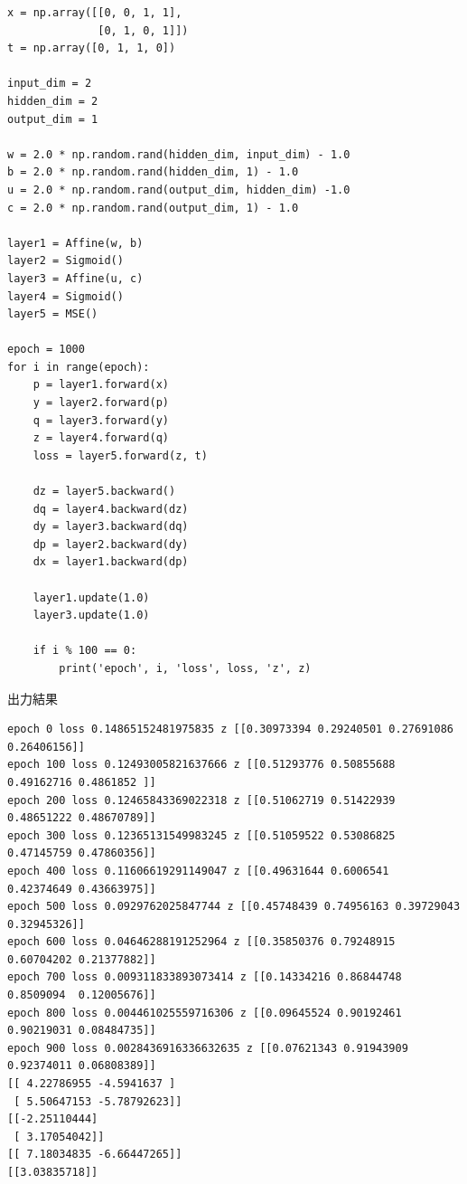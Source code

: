\documentclass[11pt, a4paper]{jsarticle}
\begin{document}
  \begin{lstlisting}[caption=Exercise~3.5, label=src:exercise3.5]
x = np.array([[0, 0, 1, 1],
              [0, 1, 0, 1]])
t = np.array([0, 1, 1, 0])

input_dim = 2
hidden_dim = 2
output_dim = 1

w = 2.0 * np.random.rand(hidden_dim, input_dim) - 1.0
b = 2.0 * np.random.rand(hidden_dim, 1) - 1.0
u = 2.0 * np.random.rand(output_dim, hidden_dim) -1.0
c = 2.0 * np.random.rand(output_dim, 1) - 1.0

layer1 = Affine(w, b)
layer2 = Sigmoid()
layer3 = Affine(u, c)
layer4 = Sigmoid()
layer5 = MSE()

epoch = 1000
for i in range(epoch):
    p = layer1.forward(x)
    y = layer2.forward(p)
    q = layer3.forward(y)
    z = layer4.forward(q)
    loss = layer5.forward(z, t)

    dz = layer5.backward()
    dq = layer4.backward(dz)
    dy = layer3.backward(dq)
    dp = layer2.backward(dy)
    dx = layer1.backward(dp)

    layer1.update(1.0)
    layer3.update(1.0)

    if i % 100 == 0:
        print('epoch', i, 'loss', loss, 'z', z)
  \end{lstlisting}

  \begin{itembox}[l]{出力結果}
    {\footnotesize
    \begin{verbatim}
epoch 0 loss 0.14865152481975835 z [[0.30973394 0.29240501 0.27691086 0.26406156]]
epoch 100 loss 0.12493005821637666 z [[0.51293776 0.50855688 0.49162716 0.4861852 ]]
epoch 200 loss 0.12465843369022318 z [[0.51062719 0.51422939 0.48651222 0.48670789]]
epoch 300 loss 0.12365131549983245 z [[0.51059522 0.53086825 0.47145759 0.47860356]]
epoch 400 loss 0.11606619291149047 z [[0.49631644 0.6006541  0.42374649 0.43663975]]
epoch 500 loss 0.0929762025847744 z [[0.45748439 0.74956163 0.39729043 0.32945326]]
epoch 600 loss 0.04646288191252964 z [[0.35850376 0.79248915 0.60704202 0.21377882]]
epoch 700 loss 0.009311833893073414 z [[0.14334216 0.86844748 0.8509094  0.12005676]]
epoch 800 loss 0.004461025559716306 z [[0.09645524 0.90192461 0.90219031 0.08484735]]
epoch 900 loss 0.0028436916336632635 z [[0.07621343 0.91943909 0.92374011 0.06808389]]
[[ 4.22786955 -4.5941637 ]
 [ 5.50647153 -5.78792623]]
[[-2.25110444]
 [ 3.17054042]]
[[ 7.18034835 -6.66447265]]
[[3.03835718]]
    \end{verbatim}}
  \end{itembox}
\end{document}
